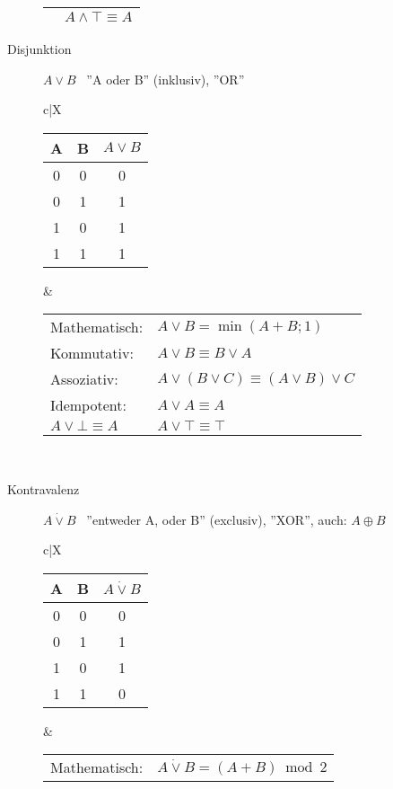 \documentclass[12pt,a4paper]{article}
\begin{document}
\begin{description}
\begin{description}
\begin{tabularx}{\linewidth}{c|X}
\begin{tabular}[t]{ll}
						$A \wedge \bot \equiv \bot$ & $A \wedge \top \equiv A$
					\end{tabular} \\ \hline
				\end{tabularx}
			\item[Disjunktion] $A\vee B$ \, ''A oder B'' (inklusiv), ''OR'' \\
				\begin{tabularx}{\linewidth}{c|X}
					\begin{tabular}[t]{c|c||c}
						A & B & $A \vee B$ \\ \hline\hline
						0 & 0 & 0          \\ \hline
						0 & 1 & 1          \\ \hline
						1 & 0 & 1          \\ \hline
						1 & 1 & 1
					\end{tabular} &
					\begin{tabular}[t]{ll}
						Mathematisch:           & $A \vee B = \min(A+B;1)$                     \\
						Kommutativ:             & $A \vee B \equiv B \vee A$                   \\
						Assoziativ:             & $A \vee (B \vee C) \equiv (A \vee B) \vee C$ \\
						Idempotent:             & $A \vee A \equiv A$                          \\
						$A \vee \bot \equiv A $ & $A \vee \top \equiv \top$
					\end{tabular} \\ \hline
				\end{tabularx}
			\item[Kontravalenz] $A\dot{\vee}B$ \, ''entweder A, oder B'' (exclusiv), ''XOR'', auch: $A\oplus B$ \\
				\begin{tabularx}{\linewidth}{c|X}
					\begin{tabular}[t]{c|c||c}
						A & B & $A \dot{\vee} B$ \\ \hline\hline
						0 & 0 & 0                \\ \hline
						0 & 1 & 1                \\ \hline
						1 & 0 & 1                \\ \hline
						1 & 1 & 0
					\end{tabular} &
					\begin{tabular}[t]{ll}
						Mathematisch:                & $A \dot{\vee} B = (A + B)\bmod 2$                                    \\

\end{tabular}
\end{tabularx}
\end{description}
\end{description}
\end{document}
